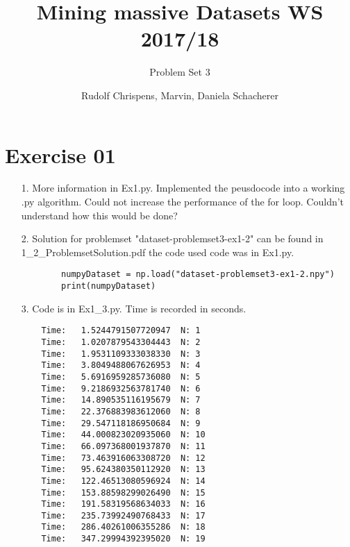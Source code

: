 \documentclass[11pt,a4paper]{scrartcl}
\title{Mining massive Datasets WS 2017/18}
\subtitle{Problem Set 3}
\author{Rudolf Chrispens, Marvin, Daniela Schacherer}
\begin{document}
\maketitle

\section*{Exercise 01}
\begin{itemize}
\item[1.] More information in Ex1.py.
	Implemented the peusdocode into a working .py algorithm.
	Could not increase the performance of the for loop. Couldn't understand how this would be done?
\item[2.] 
	Solution for problemset "dataset-problemset3-ex1-2" can be found in 1\_2\_ProblemsetSolution.pdf the code
	used code was in Ex1.py. 
	\begin{lstlisting}
		numpyDataset = np.load("dataset-problemset3-ex1-2.npy")
		print(numpyDataset)
	\end{lstlisting}
\item[3.] Code is in  Ex1\_3.py. Time is recorded in seconds.
\begin{verbatim}	
	Time: 	1.5244791507720947	N: 1
	Time: 	1.0207879543304443	N: 2
	Time: 	1.9531109333038330	N: 3
	Time: 	3.8049488067626953	N: 4
	Time: 	5.6916959285736080	N: 5
	Time: 	9.2186932563781740	N: 6
	Time: 	14.890535116195679	N: 7
	Time: 	22.376883983612060	N: 8
	Time: 	29.547118186950684	N: 9
	Time: 	44.000823020935060	N: 10
	Time: 	66.097368001937870	N: 11
	Time: 	73.463916063308720	N: 12
	Time: 	95.624380350112920	N: 13
	Time: 	122.46513080596924	N: 14
	Time: 	153.88598299026490	N: 15
	Time: 	191.58319568634033	N: 16
	Time: 	235.73992490768433	N: 17
	Time: 	286.40261006355286	N: 18
	Time: 	347.29994392395020	N: 19
\end{verbatim}
\end{itemize}
\end{document}
